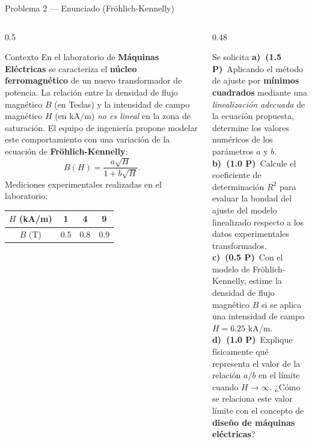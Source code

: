\documentclass[aspectratio=169,10pt]{beamer}
\begin{document}
\begin{frame}{Problema 2 — Enunciado (Fröhlich-Kennelly)}
\begin{columns}[T]
\begin{column}{0.5\textwidth}
\begin{cardidea}{Contexto}{\faMagnet}
{\footnotesize En el laboratorio de \textbf{Máquinas Eléctricas} se caracteriza el \textbf{núcleo ferromagnético} de un nuevo transformador de potencia. La relación entre la densidad de flujo magnético $B$ (en Teslas) y la intensidad de campo magnético $H$ (en kA/m) \emph{no es lineal} en la zona de saturación. El equipo de ingeniería propone modelar este comportamiento con una variación de la ecuación de \textbf{Fröhlich-Kennelly}:
\[
B(H)=\frac{a\sqrt{H}}{1+b\sqrt{H}}.
\]
Mediciones experimentales realizadas en el laboratorio:}\\[0.6mm]
\centering
{\footnotesize\renewcommand{\arraystretch}{1.25}\setlength{\tabcolsep}{8pt}
\begin{tabular}{c|ccc}
$H$ (kA/m) & 1 & 4 & 9\\\hline
$B$ (T) & 0.5 & 0.8 & 0.9\\
\end{tabular}}
\end{cardidea}
\end{column}
\begin{column}{0.48\textwidth}
\begin{cardidea}{Se solicita}{\faTasks}
{\footnotesize
\textbf{a)\ (1.5 P)}\ Aplicando el método de ajuste por \textbf{mínimos cuadrados} mediante una \emph{linealización adecuada} de la ecuación propuesta, determine los valores numéricos de los parámetros $a$ y $b$.\\[1.0mm]
\textbf{b)\ (1.0 P)}\ Calcule el coeficiente de determinación $R^2$ para evaluar la bondad del ajuste del modelo linealizado respecto a los datos experimentales transformados.\\[1.0mm]
\textbf{c)\ (0.5 P)}\ Con el modelo de Fröhlich-Kennelly, estime la densidad de flujo magnético $B$ si se aplica una intensidad de campo $H=6.25$ kA/m.\\[1.0mm]
\textbf{d)\ (1.0 P)}\ Explique físicamente qué representa el valor de la relación $a/b$ en el límite cuando $H\to\infty$. ¿Cómo se relaciona este valor límite con el concepto de \textbf{diseño de máquinas eléctricas}?}
\end{cardidea}
\end{column}
\end{columns}
\end{frame}
\end{document}
